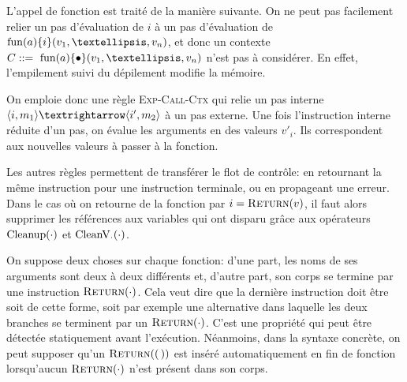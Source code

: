 



L'appel de fonction est traité de la manière suivante. On ne peut pas facilement
relier un pas d'évaluation de $i$ à un pas d'évaluation de $\eFun{a}{i}
(v_1,…,v_n)$, et donc un contexte $C \gramisa \eFun{a}{\ctxEmpty} (v_1,…,v_n)$
n'est pas à considérer. En effet, l'empilement suivi du dépilement modifie la
mémoire.

On emploie donc une règle \textsc{Exp-Call-Ctx} qui relie un pas interne
$\mm{m_1}{i}{m_2}{i'}$ à un pas externe. Une fois l'instruction interne réduite
d'un pas, on évalue les arguments en des valeurs $v'_i$. Ils correspondent aux
nouvelles valeurs à passer à la fonction.

Les autres règles permettent de transférer le flot de contrôle: en retournant
la même instruction pour une instruction terminale, ou en propageant une erreur.
Dans le cas où on retourne de la fonction par $i = \iReturn{v}$, il faut alors
supprimer les références aux variables qui ont disparu grâce aux opérateurs
$\phx\cCleanup$ et $\phxx\cV$.

\label{page:return-fonction}
On suppose deux choses sur chaque fonction: d'une part, les noms de ses
arguments sont deux à deux différents et, d'autre part, son corps se termine par
une instruction $\iReturn{\cdot}$. Cela veut dire que la dernière instruction
doit être soit de cette forme, soit par exemple une alternative dans laquelle
les deux branches se terminent par un $\iReturn{\cdot}$. C'est une propriété qui
peut être détectée statiquement avant l'exécution. Néanmoins, dans la syntaxe
concrète, on peut supposer qu'un $\iReturn{\eUnit}$ est inséré automatiquement
en fin de fonction lorsqu'aucun $\iReturn{\cdot}$ n'est présent dans son corps.

\begin{mathpar}


\end{mathpar}


